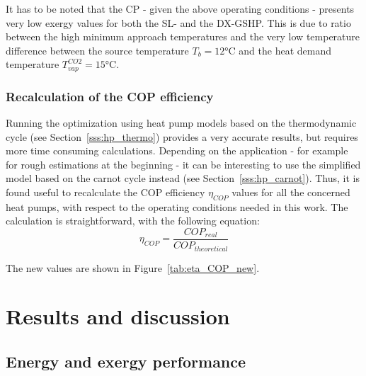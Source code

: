 \documentclass{article}
\begin{document}
It has to be noted that the CP - given the above operating conditions - presents very low  exergy values for both the SL- and the DX-GSHP. This is due to ratio between the high minimum approach temperatures and the very low temperature difference between the source temperature $T_{b} = 12 \si{\celsius}$ and the heat demand temperature $T_{vap}^{CO2} = 15 \si{\celsius}$.

\subsubsection{Recalculation of the COP efficiency}
Running the optimization using heat pump models based on the thermodynamic cycle (see Section~\ref{sss:hp_thermo}) provides a very accurate results, but requires more time consuming calculations. Depending on the application - for example for rough estimations at the beginning - it can be interesting to use the simplified model based on the carnot cycle instead (see Section~\ref{sss:hp_carnot}). Thus, it is found useful to recalculate the COP efficiency $\eta_{COP}$ values for all the concerned heat pumps, with respect to the operating conditions needed in this work. The calculation is straightforward, with the following equation:
\begin{equation}
\eta_{COP} = \frac{COP_{real}}{COP_{theoretical}}
\end{equation}



The new values are shown in Figure~\ref{tab:eta_COP_new}.


\newpage
\section{Results and discussion}

\subsection{Energy and exergy performance}\label{ss:perf}
\end{document}
